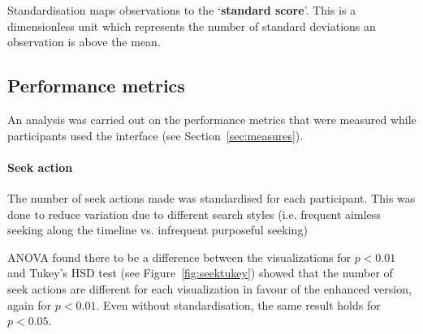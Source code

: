 Standardisation maps observations to the `\textbf{standard score}'. This is a
dimensionless unit which represents the number of standard deviations an
observation is above the mean.

\subsection{Performance metrics}\label{sec:studymetrics}
An analysis was carried out on the performance metrics that were measured while
participants used the interface (see Section~\ref{sec:measures}).

\paragraph{Seek action}
The number of seek actions made was standardised for each participant. This was
done to reduce variation due to different search styles (i.e. frequent aimless
seeking along the timeline vs. infrequent purposeful seeking)

ANOVA found there to be a difference between the visualizations for $p < 0.01$
and Tukey's HSD test (see Figure~\ref{fig:seektukey}) showed that the number of
seek actions are different for each visualization in favour of the enhanced
version, again for $p < 0.01$. Even without standardisation, the same result
holds for $p < 0.05$.

